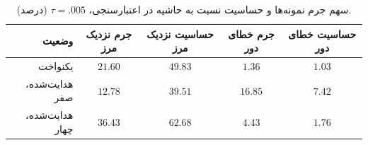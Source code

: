 \begin{table}[htbp]
\centering\small
\caption{سهم جرم نمونه‌ها و حساسیت نسبت به حاشیه در اعتبارسنجی، $\tau=.005$ (درصد).}
\label{tab:ch4-sigmoid-sensitivity}
\begin{tabular}{rcccc}\hline
وضعیت & جرم نزدیک مرز & حساسیت نزدیک مرز & جرم خطای دور & حساسیت خطای دور\\\hline
یکنواخت & $21.60$ & $49.83$ & $1.36$ & $1.03$\\
هدایت‌شده، صفر & $12.78$ & $39.51$ & $16.85$ & $7.42$\\
هدایت‌شده، چهار & $36.43$ & $62.68$ & $4.43$ & $1.76$\\
\hline
\end{tabular}
\end{table}
